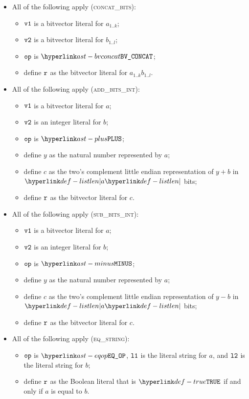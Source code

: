 \begin{itemize}
  \item All of the following apply (\textsc{concat\_bits}):
  \begin{itemize}
    \item $\texttt{v1}$ is a bitvector literal for $a_{1..k}$;
    \item $\texttt{v2}$ is a bitvector literal for $b_{1..l}$;
    \item $\texttt{op}$ is $\BVCONCAT$;
    \item define $\texttt{r}$ as the bitvector literal for $a_{1..k}b_{1..l}$.
  \end{itemize}

  \item All of the following apply (\textsc{add\_bits\_int}):
  \begin{itemize}
    \item $\texttt{v1}$ is a bitvector literal for $a$;
    \item $\texttt{v2}$ is an integer literal for $b$;
    \item $\texttt{op}$ is $\PLUS$;
    \item define $y$ as the natural number represented by $a$;
    \item define $c$ as the two's complement little endian representation of $y+b$ in $\listlen{a}$ bits;
    \item define $\texttt{r}$ as the bitvector literal for $c$.
  \end{itemize}

  \item All of the following apply (\textsc{sub\_bits\_int}):
  \begin{itemize}
    \item $\texttt{v1}$ is a bitvector literal for $a$;
    \item $\texttt{v2}$ is an integer literal for $b$;
    \item $\texttt{op}$ is $\MINUS$;
    \item define $y$ as the natural number represented by $a$;
    \item define $c$ as the two's complement little endian representation of $y-b$ in $\listlen{a}$ bits;
    \item define $\texttt{r}$ as the bitvector literal for $c$.
  \end{itemize}

  \item All of the following apply (\textsc{eq\_string}):
  \begin{itemize}
    \item $\texttt{op}$ is $\EQOP$, $\texttt{l1}$ is the literal string for $a$, and $\texttt{l2}$ is the literal string for $b$;
    \item define $\texttt{r}$ as the Boolean literal that is $\True$ if and only if $a$ is equal to $b$.
  \end{itemize}


\end{itemize}
